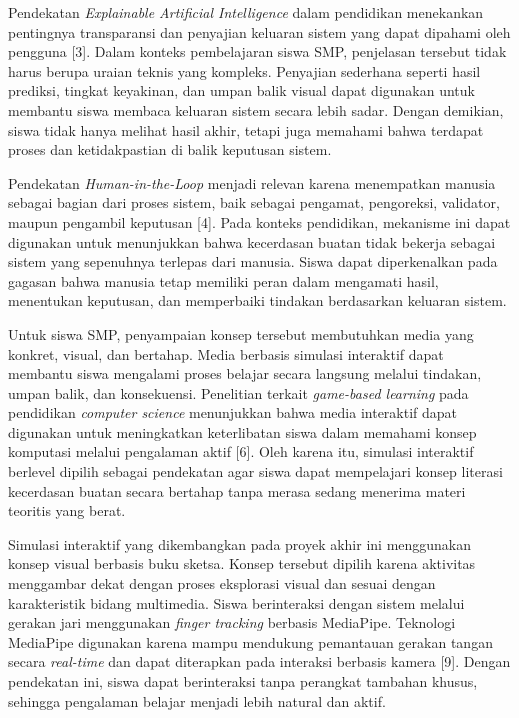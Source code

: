 \documentclass[10pt,twoside,openright]{report}
\begin{document}
Pendekatan \textit{Explainable Artificial Intelligence} dalam pendidikan menekankan pentingnya transparansi dan penyajian keluaran sistem yang dapat dipahami oleh pengguna [3]. Dalam konteks pembelajaran siswa SMP, penjelasan tersebut tidak harus berupa uraian teknis yang kompleks. Penyajian sederhana seperti hasil prediksi, tingkat keyakinan, dan umpan balik visual dapat digunakan untuk membantu siswa membaca keluaran sistem secara lebih sadar. Dengan demikian, siswa tidak hanya melihat hasil akhir, tetapi juga memahami bahwa terdapat proses dan ketidakpastian di balik keputusan sistem.

Pendekatan \textit{Human-in-the-Loop} menjadi relevan karena menempatkan manusia sebagai bagian dari proses sistem, baik sebagai pengamat, pengoreksi, validator, maupun pengambil keputusan [4]. Pada konteks pendidikan, mekanisme ini dapat digunakan untuk menunjukkan bahwa kecerdasan buatan tidak bekerja sebagai sistem yang sepenuhnya terlepas dari manusia. Siswa dapat diperkenalkan pada gagasan bahwa manusia tetap memiliki peran dalam mengamati hasil, menentukan keputusan, dan memperbaiki tindakan berdasarkan keluaran sistem.

Untuk siswa SMP, penyampaian konsep tersebut membutuhkan media yang konkret, visual, dan bertahap. Media berbasis simulasi interaktif dapat membantu siswa mengalami proses belajar secara langsung melalui tindakan, umpan balik, dan konsekuensi. Penelitian terkait \textit{game-based learning} pada pendidikan \textit{computer science} menunjukkan bahwa media interaktif dapat digunakan untuk meningkatkan keterlibatan siswa dalam memahami konsep komputasi melalui pengalaman aktif [6]. Oleh karena itu, simulasi interaktif berlevel dipilih sebagai pendekatan agar siswa dapat mempelajari konsep literasi kecerdasan buatan secara bertahap tanpa merasa sedang menerima materi teoritis yang berat.

Simulasi interaktif yang dikembangkan pada proyek akhir ini menggunakan konsep visual berbasis buku sketsa. Konsep tersebut dipilih karena aktivitas menggambar dekat dengan proses eksplorasi visual dan sesuai dengan karakteristik bidang multimedia. Siswa berinteraksi dengan sistem melalui gerakan jari menggunakan \textit{finger tracking} berbasis MediaPipe. Teknologi MediaPipe digunakan karena mampu mendukung pemantauan gerakan tangan secara \textit{real-time} dan dapat diterapkan pada interaksi berbasis kamera [9]. Dengan pendekatan ini, siswa dapat berinteraksi tanpa perangkat tambahan khusus, sehingga pengalaman belajar menjadi lebih natural dan aktif.
\end{document}
